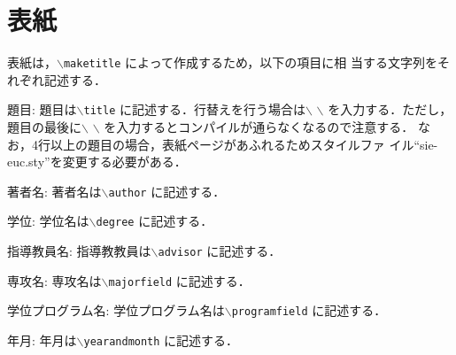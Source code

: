 \section{表紙}

表紙は，{\tt $\backslash$maketitle} によって作成するため，以下の項目に相
当する文字列をそれぞれ記述する．

\begin{description} \parskip=1pt
    \item{題目: }
          題目は{\tt $\backslash$title} に記述する．行替えを行う場合は$\backslash$
          $\backslash$ を入力する．ただし，題目の最後に$\backslash$
          $\backslash$ を入力するとコンパイルが通らなくなるので注意する．
          なお，4行以上の題目の場合，表紙ページがあふれるためスタイルファ
          イル``sie-euc.sty''を変更する必要がある．
    \item{著者名: }
          著者名は{\tt $\backslash$author} に記述する．
    \item{学位: }
          学位名は{\tt $\backslash$degree} に記述する．
    \item{指導教員名: }
          指導教教員は{\tt $\backslash$advisor} に記述する．
    \item{専攻名: }
          専攻名は{\tt $\backslash$majorfield} に記述する．
    \item{学位プログラム名: }
          学位プログラム名は{\tt $\backslash$programfield} に記述する．
    \item{年月: }
          年月は{\tt $\backslash$yearandmonth} に記述する．
\end{description}
